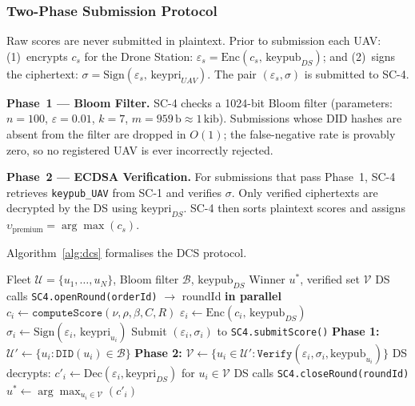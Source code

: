 \documentclass[sigplan,screen]{acmart}
\begin{document}
\subsubsection{Two-Phase Submission Protocol}
Raw scores are never submitted in plaintext.
Prior to submission each UAV:
(1)~encrypts $c_s$ for the Drone Station:
    $\varepsilon_s = \text{Enc}(c_s,\, \text{keypub}_{DS})$; and
(2)~signs the ciphertext:
    $\sigma = \text{Sign}(\varepsilon_s,\, \text{keypri}_{UAV})$.
The pair $(\varepsilon_s, \sigma)$ is submitted to SC-4.

\noindent\textbf{Phase~1 — Bloom Filter.}
SC-4 checks a 1024-bit Bloom filter (parameters: $n=100$, $\varepsilon=0.01$,
$k=7$, $m=959\,\text{b} \approx 1\,\text{kib}$).
Submissions whose DID hashes are absent from the filter are dropped in $O(1)$;
the false-negative rate is provably zero, so no registered UAV is ever
incorrectly rejected.

\noindent\textbf{Phase~2 — ECDSA Verification.}
For submissions that pass Phase~1, SC-4 retrieves \texttt{keypub\_UAV} from
SC-1 and verifies $\sigma$.
Only verified ciphertexts are decrypted by the DS using $\text{keypri}_{DS}$.
SC-4 then sorts plaintext scores and assigns
$\upsilon_{\text{premium}} = \arg\max(c_s)$.

Algorithm~\ref{alg:dcs} formalises the DCS protocol.

\begin{algorithm}[t]
\caption{Two-Phase DCS Selection}\label{alg:dcs}
\footnotesize
\begin{algorithmic}[1]
\Require Fleet $\mathcal{U} = \{u_1,\ldots,u_N\}$, Bloom filter $\mathcal{B}$,
         $\text{keypub}_{DS}$
\Ensure  Winner $u^*$, verified set $\mathcal{V}$
\State DS calls \texttt{SC4.openRound(orderId)} $\to$ roundId
 \textbf{in parallel}
  \State $c_i \leftarrow \texttt{computeScore}(\nu,\rho,\beta,C,R)$
  \State $\varepsilon_i \leftarrow \text{Enc}(c_i,\, \text{keypub}_{DS})$
  \State $\sigma_i \leftarrow \text{Sign}(\varepsilon_i,\, \text{keypri}_{u_i})$
  \State Submit $(\varepsilon_i, \sigma_i)$ to \texttt{SC4.submitScore()}
\EndFor
\State \textbf{Phase 1:} $\mathcal{U}' \leftarrow \{u_i : \texttt{DID}(u_i) \in \mathcal{B}\}$
  \hfill{}
\State \textbf{Phase 2:} $\mathcal{V} \leftarrow \{u_i \in \mathcal{U}' : \texttt{Verify}(\varepsilon_i,\sigma_i,\text{keypub}_{u_i})\}$
\State DS decrypts: $c'_i \leftarrow \text{Dec}(\varepsilon_i, \text{keypri}_{DS})$ for $u_i \in \mathcal{V}$
\State DS calls \texttt{SC4.closeRound(roundId)}
\State $u^* \leftarrow \arg\max_{u_i \in \mathcal{V}}(c'_i)$
  \hfill{}
\end{algorithmic}
\end{algorithm}
\end{document}
